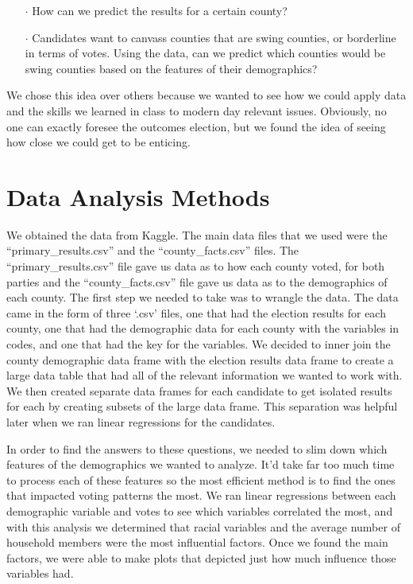 \documentclass[11pt]{article}
\begin{document}
\begin{enumerate}
	\item[$\cdot$] How can we predict the results for a certain county? 
	\item[$\cdot$] Candidates want to canvass counties that are swing counties, or borderline in terms of votes. Using the data, can we predict which counties would be swing counties based on the features of their demographics?
\end{enumerate}
We chose this idea over others because we wanted to see how we could apply data and the skills we learned in class to modern day relevant issues. Obviously, no one can exactly foresee the outcomes election, but we found the idea of seeing how close we could get to be enticing.
\newpage

\section{Data Analysis Methods}
We obtained the data from Kaggle. The main data files that we used were the “primary\_results.csv” and the “county\_facts.csv” files. The “primary\_results.csv” file gave us data as to how each county voted, for both parties and the “county\_facts.csv” file gave us data as to the demographics of each county. 
The first step we needed to take was to wrangle the data. The data came in the form of three ‘.csv’ files, one that had the election results for each county, one that had the demographic data for each county with the variables in codes, and one that had the key for the variables.  We decided to inner join the county demographic data frame with the election results data frame to create a large data table that had all of the relevant information we wanted to work with. We then created separate data frames for each candidate to get isolated results for each by creating subsets of the large data frame. This separation was helpful later when we ran linear regressions for the candidates.

In order to find the answers to these questions, we needed to slim down which features of the demographics we wanted to analyze. It’d take far too much time to process each of these features so the most efficient method is to find the ones that impacted voting patterns the most. We ran linear regressions between each demographic variable and votes to see which variables correlated the most, and with this analysis we determined that racial variables and the average number of household members were the most influential factors. Once we found the main factors, we were able to make plots that depicted just how much influence those variables had. 
\end{document}
